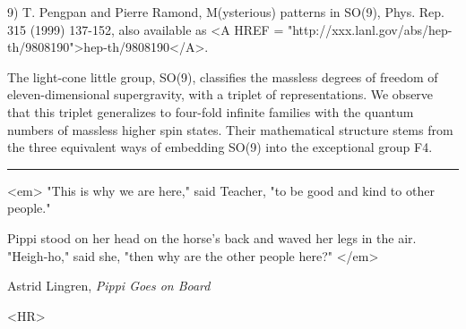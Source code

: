 9) T. Pengpan and Pierre Ramond, M(ysterious) patterns in SO(9),
Phys. Rep. 315 (1999) 137-152, also available as <A HREF = "http://xxx.lanl.gov/abs/hep-th/9808190">hep-th/9808190</A>.

The light-cone little group, SO(9), classifies the massless degrees of
freedom of eleven-dimensional supergravity, with a triplet of
representations. We observe that this triplet generalizes to four-fold
infinite families with the quantum numbers of massless higher spin
states. Their mathematical structure stems from the three equivalent
ways of embedding SO(9) into the exceptional group F4.


\par\noindent\rule{\textwidth}{0.4pt}
<em>
"This is why we are here," said Teacher, "to be good
and kind to other people."

Pippi stood on her head on the horse's back and waved her legs in the
air.  "Heigh-ho," said she, "then why are the other
people here?" </em> 

Astrid Lingren, \emph{Pippi Goes on Board}

<HR>



